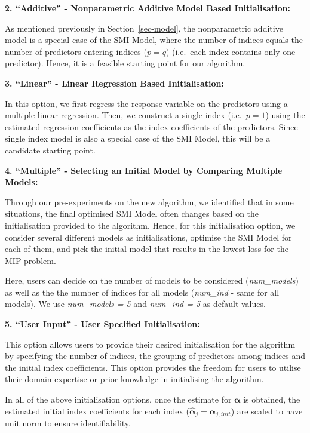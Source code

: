\documentclass[11pt,a4paper,]{article}
\begin{document}
\textbf{2. ``Additive'' - Nonparametric Additive Model Based
Initialisation:}

As mentioned previously in Section~\ref{sec-model}, the nonparametric
additive model is a special case of the SMI Model, where the number of
indices equals the number of predictors entering indices (\(p = q\))
(i.e.~each index contains only one predictor). Hence, it is a feasible
starting point for our algorithm.

\textbf{3. ``Linear'' - Linear Regression Based Initialisation:}

In this option, we first regress the response variable on the predictors
using a multiple linear regression. Then, we construct a single index
(i.e.~\(p = 1\)) using the estimated regression coefficients as the
index coefficients of the predictors. Since single index model is also a
special case of the SMI Model, this will be a candidate starting point.

\textbf{4. ``Multiple'' - Selecting an Initial Model by Comparing
Multiple Models:}

Through our pre-experiments on the new algorithm, we identified that in
some situations, the final optimised SMI Model often changes based on
the initialisation provided to the algorithm. Hence, for this
initialisation option, we consider several different models as
initialisations, optimise the SMI Model for each of them, and pick the
initial model that results in the lowest loss for the MIP problem.

Here, users can decide on the number of models to be considered
(\emph{num\_models}) as well as the the number of indices for all models
(\emph{num\_ind} - same for all models). We use \emph{num\_models = 5}
and \emph{num\_ind = 5} as default values.

\textbf{5. ``User Input'' - User Specified Initialisation:}

This option allows users to provide their desired initialisation for the
algorithm by specifying the number of indices, the grouping of
predictors among indices and the initial index coefficients. This option
provides the freedom for users to utilise their domain expertise or
prior knowledge in initialising the algorithm.

In all of the above initialisation options, once the estimate for
\(\bm{\alpha}\) is obtained, the estimated initial index coefficients
for each index (\(\hat{\bm{\alpha}}_{j} = \bm{\alpha}_{j, init}\)) are
scaled to have unit norm to ensure identifiability.
\end{document}
